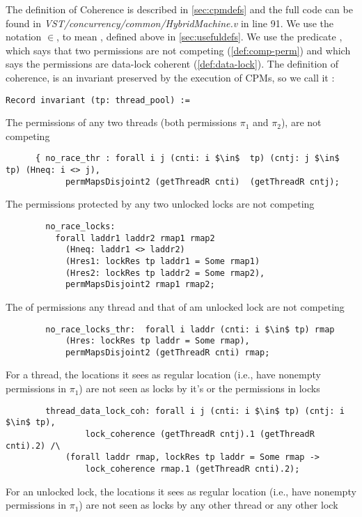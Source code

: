 The definition of Coherence is described in \cref{sec:cpmdefs} and the full code can be found in \emph{VST/concurrency/common/HybridMachine.v} in line 91. We use the notation $\in$, to mean , defined above in \cref{sec:usefuldefs}. 
We use the predicate , which says that two permissions are not competing (\cref{def:comp-perm}) and 
 which says the permissions are data-lock coherent (\cref{def:data-lock}).
The definition of coherence, is an invariant preserved by the execution of CPMs, so we call it : 
\begin{lstlisting}[firstnumber=1]
    Record invariant (tp: thread_pool) :=
\end{lstlisting}     
\noindent The permissions of any two threads (both permissions $\pi_1$ and $\pi_2$), are not competing 
\begin{lstlisting}	
      { no_race_thr : forall i j (cnti: i $\in$  tp) (cntj: j $\in$ tp) (Hneq: i <> j),
            permMapsDisjoint2 (getThreadR cnti)  (getThreadR cntj); 
\end{lstlisting}     
\noindent  The permissions protected by any two unlocked locks are not competing 
\begin{lstlisting}
        no_race_locks:
          forall laddr1 laddr2 rmap1 rmap2
            (Hneq: laddr1 <> laddr2)
            (Hres1: lockRes tp laddr1 = Some rmap1)
            (Hres2: lockRes tp laddr2 = Some rmap2),
            permMapsDisjoint2 rmap1 rmap2; 
\end{lstlisting}     
\noindent The of permissions any thread and that of am unlocked lock are not competing 
\begin{lstlisting}
        no_race_locks_thr:  forall i laddr (cnti: i $\in$ tp) rmap
            (Hres: lockRes tp laddr = Some rmap), 
            permMapsDisjoint2 (getThreadR cnti) rmap;
\end{lstlisting}     
\noindent For a thread, the locations it sees as regular location (i.e., have nonempty permissions in  $\pi_1$) are not seen as locks by it's or the permissions in locks  
\begin{lstlisting}
        thread_data_lock_coh: forall i j (cnti: i $\in$ tp) (cntj: i $\in$ tp),
                lock_coherence (getThreadR cntj).1 (getThreadR cnti).2) /\
            (forall laddr rmap, lockRes tp laddr = Some rmap ->
                lock_coherence rmap.1 (getThreadR cnti).2);
\end{lstlisting}     
\noindent For an unlocked lock, the locations it sees as regular location (i.e., have nonempty permissions in  $\pi_1$) are not seen as locks by any other thread or any other lock  
